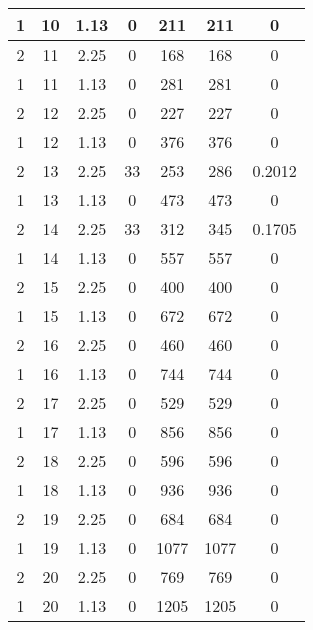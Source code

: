 \documentclass[letterpaper, 12pt]{article}
\begin{document}
\begin{longtable}{|c|c|c|c|c|c|c|}
\hline
1 & 10 & 1.13 & 0 & 211 & 211 & 0 \\
\hline
2 & 11 & 2.25 & 0 & 168 & 168 & 0 \\
\hline
1 & 11 & 1.13 & 0 & 281 & 281 & 0 \\
\hline
2 & 12 & 2.25 & 0 & 227 & 227 & 0 \\
\hline
1 & 12 & 1.13 & 0 & 376 & 376 & 0 \\
\hline
2 & 13 & 2.25 & 33 & 253 & 286 & 0.2012 \\
\hline
1 & 13 & 1.13 & 0 & 473 & 473 & 0 \\
\hline
2 & 14 & 2.25 & 33 & 312 & 345 & 0.1705 \\
\hline
1 & 14 & 1.13 & 0 & 557 & 557 & 0 \\
\hline
2 & 15 & 2.25 & 0 & 400 & 400 & 0 \\
\hline
1 & 15 & 1.13 & 0 & 672 & 672 & 0 \\
\hline
2 & 16 & 2.25 & 0 & 460 & 460 & 0 \\
\hline
1 & 16 & 1.13 & 0 & 744 & 744 & 0 \\
\hline
2 & 17 & 2.25 & 0 & 529 & 529 & 0 \\
\hline
1 & 17 & 1.13 & 0 & 856 & 856 & 0 \\
\hline
2 & 18 & 2.25 & 0 & 596 & 596 & 0 \\
\hline
1 & 18 & 1.13 & 0 & 936 & 936 & 0 \\
\hline
2 & 19 & 2.25 & 0 & 684 & 684 & 0 \\
\hline
1 & 19 & 1.13 & 0 & 1077 & 1077 & 0 \\
\hline
2 & 20 & 2.25 & 0 & 769 & 769 & 0 \\
\hline
1 & 20 & 1.13 & 0 & 1205 & 1205 & 0 \\
\hline
\end{longtable}
\end{document}
